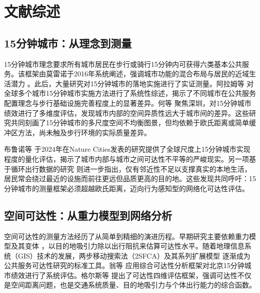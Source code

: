 \documentclass[10pt,conference]{IEEEtran}
\begin{document}
\section{文献综述}
\label{sec:literature}

\subsection{15分钟城市：从理念到测量}

15分钟城市理念要求所有城市居民在步行或骑行15分钟内可获得六类基本公共服务。该框架由莫雷诺于2016年系统阐述，强调城市功能的混合布局与居民的近域生活潜力 \cite{moreno202115minute}。此后，大量研究对15分钟城市的落地实施进行了实证测量。阿拉姆等 \cite{allam2022operationalising} 对全球多个城市15分钟城市实施方法进行了系统性综述，揭示了不同城市在公共服务配置理念与步行基础设施完善程度上的显著差异。何等 \cite{he2023twenty} 聚焦深圳，对15分钟城市绩效进行了多维度评估，发现城市内部的空间异质性远大于城市间的差异。这些研究共同刻画了15分钟城市的多尺度空间不均衡图景，但均依赖于欧氏距离或简单缓冲区方法，尚未触及步行环境的实际质量差异。

布鲁诺等 \cite{bruno2024universal} 于2024年在Nature Cities发表的研究提供了全球尺度上15分钟城市实现程度的量化评估，揭示了城市内部与城市之间可达性不平等的严峻现实。另一项基于循环出行数据的研究 \cite{recurrent2025} 则进一步指出，仅有邻近性不足以支撑真实的本地生活，居民常会绕过最近的设施而前往更远但品质更高的目的地。这些发现共同呼吁：15分钟城市的测量框架必须超越欧氏距离，迈向行为感知型的网络化可达性评估。

\subsection{空间可达性：从重力模型到网络分析}

空间可达性的测量方法经历了从简单到精细的演进历程。早期研究主要依赖重力模型及其变体 \cite{hansen1959accessibility}，以目的地吸引力除以出行阻抗来估算可达性水平。随着地理信息系统（GIS）技术的发展，两步移动搜索法（2SFCA）及其系列扩展模型 \cite{luo2004using,luo2011extending,dai2010spatial,wang2012measuring} 逐渐成为公共服务可达性研究的标准工具。翁等 \cite{weng2021accessibility} 应用综合可达性分析框架对北京15分钟城市绩效进行了系统评估。格尔斯等 \cite{geurs2004accessibility} 提出了可达性四维评估框架，强调可达性不仅是空间距离问题，也是交通系统质量、目的地吸引力与个体出行能力的综合函数。
\end{document}
